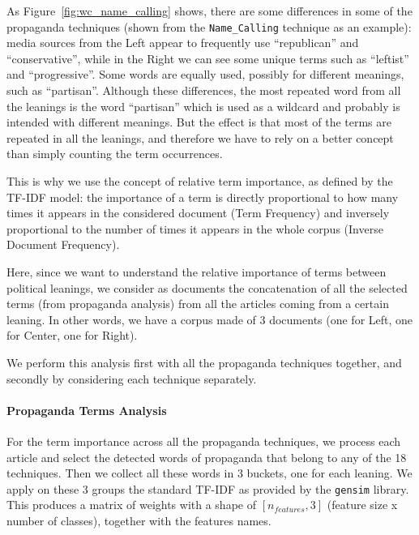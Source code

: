 As Figure~\ref{fig:wc_name_calling} shows, there are some differences in some of the propaganda techniques (shown from the \texttt{Name\_Calling} technique as an example):
media sources from the Left appear to frequently use ``republican'' and ``conservative'', while in the Right we can see some unique terms such as ``leftist'' and ``progressive''. Some words are equally used, possibly for different meanings, such as ``partisan''.  
Although these differences, the most repeated word from all the leanings is the word ``partisan'' which is used as a wildcard and probably is intended with different meanings.
But the effect is that most of the terms are repeated in all the leanings, and therefore we have to rely on a better concept than simply counting the term occurrences.

This is why we use the concept of relative term importance, %
as defined by the TF-IDF model: the importance of a term is directly proportional to how many times it appears in the considered document (Term Frequency) and inversely proportional to the number of times it appears in the whole corpus (Inverse Document Frequency).

Here, since we want to understand the relative importance of terms between political leanings, we consider as documents the concatenation of all the selected terms (from propaganda analysis) from all the articles coming from a certain leaning. In other words, we have a corpus made of 3 documents (one for Left, one for Center, one for Right).

We perform this analysis first with all the propaganda techniques together, and secondly by considering each technique separately.

\paragraph{Propaganda Terms Analysis}
For the term importance across all the propaganda techniques, we process each article and select the detected words of propaganda that belong to any of the 18 techniques. Then we collect all these words in 3 buckets, one for each leaning.
We apply on these 3 groups the standard TF-IDF as provided by the \texttt{gensim} library. %
This produces a matrix of weights with a shape of $[n_{features}, 3]$ (feature size x number of classes), together with the features names.

